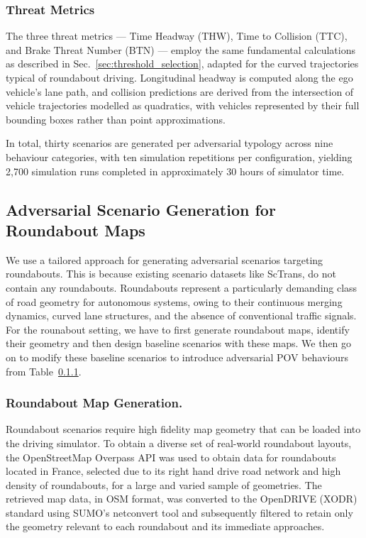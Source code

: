 \subsubsection{Threat Metrics}

The three threat metrics — Time Headway (THW), Time to Collision (TTC), and Brake Threat Number (BTN) — employ the same fundamental calculations as described in Sec.~\ref{sec:threshold_selection}, adapted for the curved trajectories typical of roundabout driving. Longitudinal headway is computed along the ego vehicle's lane path, and collision predictions are derived from the intersection of vehicle trajectories modelled as quadratics, with vehicles represented by their full bounding boxes rather than point approximations.

In total, thirty scenarios are generated per adversarial typology across nine behaviour categories, with ten simulation repetitions per configuration, yielding 2,700 simulation runs completed in approximately 30 hours of simulator time.
\iffalse
\subsection{Adversarial Scenario Generation for Roundabout Maps}
We use a tailored approach for generating adversarial scenarios targeting roundabouts. This is because existing scenario datasets like ScTrans, do not contain any roundabouts. Roundabouts represent a particularly demanding class of road geometry for autonomous systems, owing to their continuous merging dynamics, curved lane structures, and the absence of conventional traffic signals. For the rounabout setting, we have to first generate roundabout maps, identify their geometry and then design baseline scenarios with these maps. We then go on to modify these baseline scenarios to introduce adversarial POV behaviours from Table~\ref{}.   

\subsubsection{Roundabout Map Generation.}
Roundabout scenarios require high fidelity map geometry that can be loaded into the driving simulator. To obtain a diverse set of real-world roundabout layouts, the OpenStreetMap Overpass API was used to obtain data for roundabouts located in France, selected due to its right hand drive road network and high density of roundabouts, for a large and varied sample of geometries. The retrieved map data, in OSM format, was converted to the OpenDRIVE (XODR) standard using SUMO's netconvert tool and subsequently filtered to retain only the geometry relevant to each roundabout and its immediate approaches.


